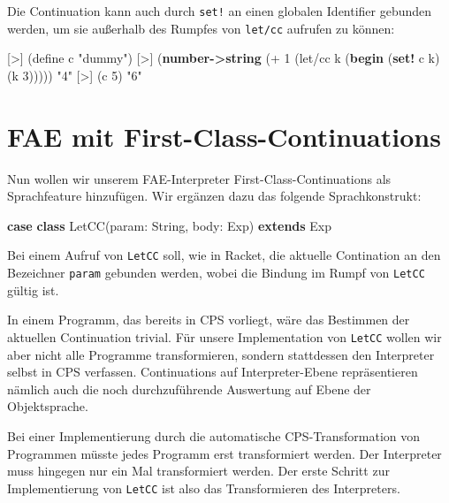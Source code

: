 \documentclass[]{article}
\newenvironment{Shaded}{}{}
\newcommand{\DecValTok}[1]{\textcolor[rgb]{0.25,0.63,0.44}{#1}}
\newcommand{\ExtensionTok}[1]{#1}
\newcommand{\FunctionTok}[1]{\textcolor[rgb]{0.02,0.16,0.49}{#1}}
\newcommand{\KeywordTok}[1]{\textcolor[rgb]{0.00,0.44,0.13}{\textbf{#1}}}
\newcommand{\NormalTok}[1]{#1}
\newcommand{\OperatorTok}[1]{\textcolor[rgb]{0.40,0.40,0.40}{#1}}
\newcommand{\StringTok}[1]{\textcolor[rgb]{0.25,0.44,0.63}{#1}}
\begin{document}
Die Continuation kann auch durch \texttt{set!} an einen globalen
Identifier gebunden werden, um sie außerhalb des Rumpfes von
\texttt{let/cc} aufrufen zu können:

\begin{Shaded}
\begin{Highlighting}[]
\OperatorTok{[\textgreater{}]}\NormalTok{ (}\ExtensionTok{define}\FunctionTok{ c }\StringTok{"dummy"}\NormalTok{)}
\OperatorTok{[\textgreater{}]}\NormalTok{ (}\KeywordTok{number{-}\textgreater{}string}\NormalTok{ (}\OperatorTok{+} \DecValTok{1}\NormalTok{ (let/cc k (}\KeywordTok{begin}\NormalTok{ (}\KeywordTok{set!}\NormalTok{ c k) (k }\DecValTok{3}\NormalTok{)))))}
\StringTok{"4"}
\OperatorTok{[\textgreater{}]}\NormalTok{ (c }\DecValTok{5}\NormalTok{)}
\StringTok{"6"}
\end{Highlighting}
\end{Shaded}

\hypertarget{fae-mit-first-class-continuations}{%
\section{FAE mit
First-Class-Continuations}\label{fae-mit-first-class-continuations}}

Nun wollen wir unserem FAE-Interpreter First-Class-Continuations als
Sprachfeature hinzufügen. Wir ergänzen dazu das folgende
Sprachkonstrukt:

\begin{Shaded}
\begin{Highlighting}[]
\KeywordTok{case} \KeywordTok{class} \FunctionTok{LetCC}\NormalTok{(param: String, body: Exp) }\KeywordTok{extends}\NormalTok{ Exp}
\end{Highlighting}
\end{Shaded}

Bei einem Aufruf von \texttt{LetCC} soll, wie in Racket, die aktuelle
Contination an den Bezeichner \texttt{param} gebunden werden, wobei die
Bindung im Rumpf von \texttt{LetCC} gültig ist.

In einem Programm, das bereits in CPS vorliegt, wäre das Bestimmen der
aktuellen Continuation trivial. Für unsere Implementation von
\texttt{LetCC} wollen wir aber nicht alle Programme transformieren,
sondern stattdessen den Interpreter selbst in CPS verfassen.
Continuations auf Interpreter-Ebene repräsentieren nämlich auch die noch
durchzuführende Auswertung auf Ebene der Objektsprache.

Bei einer Implementierung durch die automatische CPS-Transformation von
Programmen müsste jedes Programm erst transformiert werden. Der
Interpreter muss hingegen nur ein Mal transformiert werden. Der erste
Schritt zur Implementierung von \texttt{LetCC} ist also das
Transformieren des Interpreters.
\end{document}
